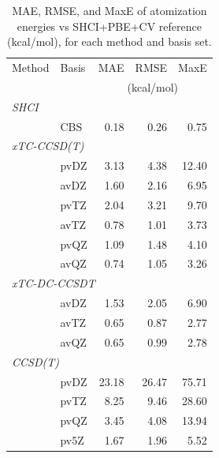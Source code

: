 \begin{table}[h]
\centering
\caption{MAE, RMSE, and MaxE of atomization energies vs SHCI+PBE+CV reference (kcal/mol), for each method and basis set.}
\label{tab:errors_shci_pbe}
\begin{tabular}{@{}llrrr@{}}
\toprule
Method & Basis & MAE & RMSE & MaxE \\
 & & \multicolumn{3}{c}{(kcal/mol)} \\
\midrule
\multicolumn{5}{l}{\textit{SHCI}} \\
 & CBS & 0.18 & 0.26 & 0.75 \\
\midrule
\multicolumn{5}{l}{\textit{xTC-CCSD(T)}} \\
 & pvDZ & 3.13 & 4.38 & 12.40 \\
 & avDZ & 1.60 & 2.16 & 6.95 \\
 & pvTZ & 2.04 & 3.21 & 9.70 \\
 & avTZ & 0.78 & 1.01 & 3.73 \\
 & pvQZ & 1.09 & 1.48 & 4.10 \\
 & avQZ & 0.74 & 1.05 & 3.26 \\
\midrule
\multicolumn{5}{l}{\textit{xTC-DC-CCSDT}} \\
 & avDZ & 1.53 & 2.05 & 6.90 \\
 & avTZ & 0.65 & 0.87 & 2.77 \\
 & avQZ & 0.65 & 0.99 & 2.78 \\
\midrule
\multicolumn{5}{l}{\textit{CCSD(T)}} \\
 & pvDZ & 23.18 & 26.47 & 75.71 \\
 & pvTZ & 8.25 & 9.46 & 28.60 \\
 & pvQZ & 3.45 & 4.08 & 13.94 \\
 & pv5Z & 1.67 & 1.96 & 5.52 \\
\bottomrule
\end{tabular}
\end{table}

